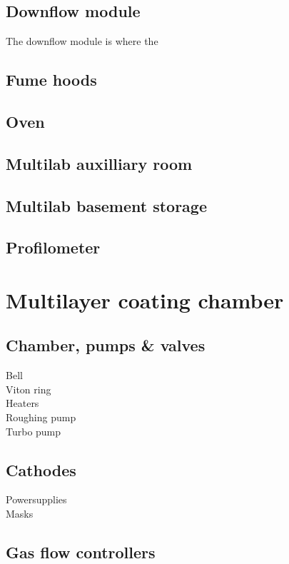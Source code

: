 \subsection{Downflow module}
The downflow module is where the 

\subsection{Fume hoods}

\subsection{Oven}

\subsection{Multilab auxilliary room}

\subsection{Multilab basement storage}

\subsection{Profilometer}

\section{Multilayer coating chamber}\label{sec:ml_chamber}

\subsection{Chamber, pumps \& valves}
Bell\\
Viton ring\\
Heaters\\
Roughing pump\\
Turbo pump

\subsection{Cathodes}
Powersupplies\\
Masks\\

\subsection{Gas flow controllers}

